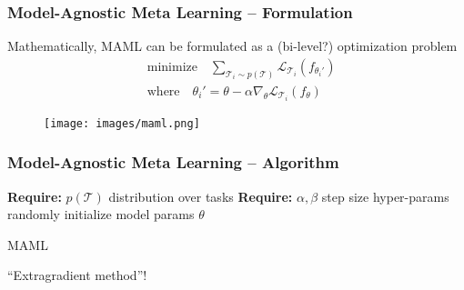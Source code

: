 
\begin{frame}
\frametitle{Model-Agnostic Meta Learning -- Formulation}

Mathematically, MAML can be formulated as a (bi-level?) optimization problem
\begin{align*}
    & \text{minimize} \quad \sum\limits_{\mathcal{T}_i\sim p(\mathcal{T})} \mathcal{L}_{\mathcal{T}_i} (f_{\theta_i'}) \\
    & \text{where} \quad \theta_i' = \theta - \alpha \nabla_{\theta} \mathcal{L}_{\mathcal{T}_i}(f_{\theta})
\end{align*}

\begin{figure}
    \centering
    \texttt{[image: images/maml.png]}
\end{figure}

\end{frame}


\begin{frame}
\frametitle{Model-Agnostic Meta Learning -- Algorithm}

\begin{algorithm}[H]
\SetAlgoNoLine
\DontPrintSemicolon
{\bfseries Require:} $p(\mathcal{T})$ distribution over tasks\;
{\bfseries Require:} $\alpha, \beta$ step size hyper-params\;
randomly initialize model params $\theta$\;
\caption{MAML\cite{finn2017maml}}
\end{algorithm}

\pause

``Extragradient method''!

\end{frame}


